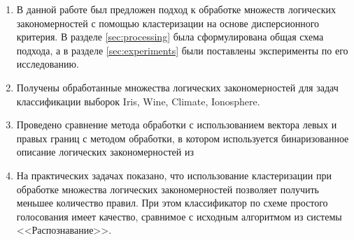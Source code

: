 \documentclass[12pt]{article}
\begin{document}




\begin{enumerate}
  \item В данной работе был предложен подход к обработке множеств
    логических закономерностей с помощью кластеризации на основе
    дисперсионного критерия. В разделе \ref{sec:processing} была
    сформулирована общая схема подхода, а в разделе
    \ref{sec:experiments} были поставлены эксперименты по его
    исследованию.
  \item Получены обработанные множества логических закономерностей для
    задач классификации выборок Iris, Wine, Climate, Ionosphere.
  \item Проведено сравнение метода обработки с использованием вектора
    левых и правых границ с методом обработки, в котором используется
    бинаризованное описание логических закономерностей из
    \cite{novikov15}
  \item На практических задачах показано, что использование
    кластеризации при обработке множества логических закономерностей
    позволяет получить меньшее количество правил. При этом
    классификатор по схеме простого голосования имеет качество,
    сравнимое с исходным алгоритмом из системы <<Распознавание>>.
\end{enumerate}
\end{document}
